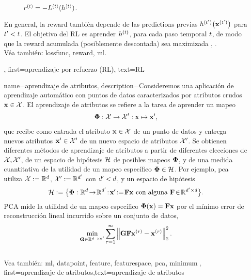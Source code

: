 {{\begin{figure}[H]
\begin{center}
{		$r^{(t)}=-L^{(t)}(h^{(t)})$.}
			\end{center}
	\end{figure}
	En general, la \gls{reward} también depende de las
	\glspl{prediction} previas $h^{(t')}\big({\bf x}^{(t')}\big)$
	para $t' < t$. El objetivo del RL es aprender $h^{(t)}$, para
	cada paso temporal $t$, de modo que la \gls{reward} acumulada (posiblemente descontada)
	sea maximizada \cite{MLBasics}, \cite{SuttonEd2}.
		\\
		Véa también: \gls{lossfunc}, \gls{reward}, \gls{ml}.},
	first={aprendizaje por refuerzo (RL)},
	text={RL}

}
{name={aprendizaje de atributos},
	description={Consideremos una aplicación de aprendizaje automático con puntos de datos caracterizados por 
	atributos crudos ${\bf x} \in \mathcal{X}$. El aprendizaje de atributos
	se refiere a la tarea de aprender un mapeo
		$${\bf \Phi}: \mathcal{X} \rightarrow \mathcal{X}': {\bf x} \mapsto {\bf x}',$$ 
		que recibe como entrada el atributo ${\bf x} \in \mathcal{X}$ de un punto de datos y entrega nuevos
		atributos ${\bf x}' \in \mathcal{X}'$ de un nuevo espacio de atributos $\mathcal{X}'$. 
		Se obtienen diferentes métodos de aprendizaje de atributos a partir de diferentes elecciones de 
		$\mathcal{X},\mathcal{X}'$, de un espacio de hipótesis $\mathcal{H}$ de posibles mapeos ${\bf \Phi}$, 
		y de una medida cuantitativa de la utilidad de un mapeo específico ${\bf \Phi} \in \mathcal{H}$. Por ejemplo, pca utiliza $\mathcal{X} := \mathbb{R}^{d}$, $\mathcal{X}' := \mathbb{R}^{d'}$
		con $d' < d$, y un espacio de hipótesis
		$$\hypospace\defeq \big\{ \featuremapvec: \mathbb{R}^{\dimlocalmodel}
		\!\rightarrow\! \mathbb{R}^{\dimlocalmodel'}\!:\!\featurevec'\!\defeq\!\mF \featurevec \mbox{ con alguna } \mF \!\in\! \mathbb{R}^{\dimlocalmodel' \times \dimlocalmodel} \big\}.$$ PCA mide la utilidad de un mapeo específico ${\bf \Phi}({\bf x})= \mathbf{F} {\bf x}$ 
		por el mínimo error de reconstrucción lineal incurrido sobre un conjunto de datos, 
	$$ \min_{\mG \in \mathbb{R}^{\dimlocalmodel \times \dimlocalmodel'}} \sum_{\sampleidx=1}^{\samplesize} \normgeneric{\mG \mF \featurevec^{(\sampleidx)} - \featurevec^{(\sampleidx)}}{2}^{2}.$$ 
	\\
		Vea también: \gls{ml}, \gls{datapoint}, \gls{feature}, \gls{featurespace}, \gls{pca}, \gls{minimum} }, 
	first={aprendizaje de atributos},text={aprendizaje de atributos}
} 

